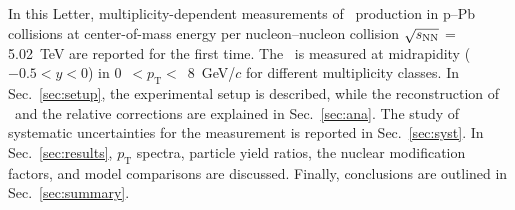 In this Letter, multiplicity-dependent measurements of \fzero~production in p--Pb collisions at center-of-mass energy per nucleon--nucleon collision $\sqrt{s_{\rm NN}}$ = 5.02~TeV are reported for the first time. The \fzero~is measured at midrapidity ($-0.5<y<0$) in 0~$<p_{\mathrm{T}}<$~8~GeV/$c$ for different multiplicity classes. In Sec.~\ref{sec:setup}, the experimental setup is described, while the reconstruction of \fzero\ and the relative corrections are explained in Sec.~\ref{sec:ana}. The study of systematic uncertainties for the measurement is reported in Sec.~\ref{sec:syst}. In Sec.~\ref{sec:results}, $p_{\mathrm{T}}$ spectra, particle yield ratios, the nuclear modification factors, and model comparisons are discussed. Finally, conclusions are outlined in Sec.~\ref{sec:summary}.

\label{sec:intro}



